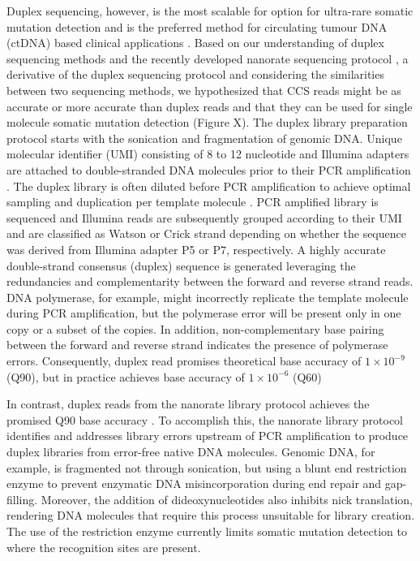 Duplex sequencing, however, is the most scalable for option for ultra-rare somatic mutation detection and is the preferred method for circulating tumour DNA (ctDNA) based clinical applications \cite{Newman2016-cy}. Based on our understanding of duplex sequencing methods \cite{Schmitt2012-yr, Hoang2016-jx} and the recently developed nanorate sequencing protocol \cite{Abascal2021-pk}, a derivative of the duplex sequencing protocol and considering the similarities between two sequencing methods, we hypothesized that CCS reads might be as accurate or more accurate than duplex reads and that they can be used for single molecule somatic mutation detection (Figure X). The duplex library preparation protocol starts with the sonication and fragmentation of genomic DNA. Unique molecular identifier (UMI) consisting of 8 to 12 nucleotide and Illumina adapters are attached to double-stranded DNA molecules prior to their PCR amplification \cite{Schmitt2012-yr}. The duplex library is often diluted before PCR amplification to achieve optimal sampling and duplication per template molecule \cite{Hoang2016-jx, Abascal2021-pk}. PCR amplified library is sequenced and Illumina reads are subsequently grouped according to their UMI and are classified as Watson or Crick strand depending on whether the sequence was derived from Illumina adapter P5 or P7, respectively. A highly accurate double-strand consensus (duplex) sequence is generated leveraging the redundancies and complementarity between the forward and reverse strand reads. DNA polymerase, for example, might incorrectly replicate the template molecule during PCR amplification, but the polymerase error will be present only in one copy or a subset of the copies. In addition, non-complementary base pairing between the forward and reverse strand indicates the presence of polymerase errors. Consequently, duplex read promises theoretical base accuracy of $1 \times 10^{-9}$ (Q90), but in practice achieves base accuracy of $1 \times 10^{-6}$ (Q60) \cite{Schmitt2012-yr}

In contrast, duplex reads from the nanorate library protocol achieves the promised Q90 base accuracy \cite{Abascal2021-pk}. To accomplish this, the nanorate library protocol identifies and addresses library errors upstream of PCR amplification to produce duplex libraries from error-free native DNA molecules. Genomic DNA, for example, is fragmented not through sonication, but using a blunt end restriction enzyme to prevent enzymatic DNA misincorporation during end repair and gap-filling. Moreover, the addition of dideoxynucleotides also inhibits nick translation, rendering DNA molecules that require this process unsuitable for library creation. The use of the restriction enzyme currently limits somatic mutation detection to where the recognition sites are present.

